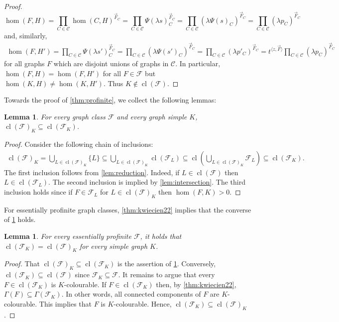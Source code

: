 \documentclass[3p,final]{elsarticle}
\DeclareMathOperator{\cl}{cl}
\newtheorem{lemma}[theorem]{Lemma}
\begin{document}
\begin{proof}
		\[
		\hom(F, H) 
		= \prod_{C \in \mathcal{C}} \hom(C, H)^{\vec{F}_C}
		= \prod_{C \in \mathcal{C}} \Psi(\lambda s)_C^{\vec{F}_C}
		= \prod_{C \in \mathcal{C}} \left(\lambda \Psi(s)_C\right)^{\vec{F}_C}
		= \prod_{C \in \mathcal{C}} \left(\lambda p_C \right)^{\vec{F}_C}
		\]
		and, similarly,
		\begin{align*}
			\hom(F, H') 
			= \prod_{C \in \mathcal{C}} \Psi(\lambda s')_C^{\vec{F}_C}
			= \prod_{C \in \mathcal{C}} \left(\lambda \Psi(s')_C\right)^{\vec{F}_C}
			= \prod_{C \in \mathcal{C}} \left(\lambda p'_C \right)^{\vec{F}_C}
			= t^{\langle z, \vec{F} \rangle} \prod_{C \in \mathcal{C}} \left(\lambda p_C \right)^{\vec{F}_C}
		\end{align*}
		for all graphs $F$ which are disjoint unions of graphs in $\mathcal{C}$. In particular, $\hom(F, H) = \hom(F, H')$ for all $F \in \mathcal{F}$ but $\hom(K, H) \neq \hom(K, H')$.
		Thus $K \not\in \cl(\mathcal{F})$.
	\end{proof}

	Towards the proof of \cref{thm:profinite}, we collect the following lemmas:

	
	\begin{lemma}\label{lem:cl-col}
		For every graph class $\mathcal{F}$ and every graph simple $K$, 
		$\cl(\mathcal{F})_K \subseteq \cl(\mathcal{F}_K)$.
	\end{lemma}
	\begin{proof}
		Consider the following chain of inclusions:
		\begin{align*}
			\cl(\mathcal{F})_K 
			= \bigcup_{L \in \cl(\mathcal{F})_K} \{L\}
			\subseteq \bigcup_{L \in \cl(\mathcal{F})_K} \cl(\mathcal{F}_L)
			\subseteq \cl\left( \bigcup_{L \in \cl(\mathcal{F})_K} \mathcal{F}_L \right)
			\subseteq \cl(\mathcal{F}_K).
		\end{align*}
		The first inclusion follows from \cref{lem:reduction}. Indeed, if $L \in \cl(\mathcal{F})$ then $L \in \cl(\mathcal{F}_L)$.
		The second inclusion is implied by \cref{lem:intersection}.
		The third inclusion holds since if $F \in \mathcal{F}_L$ for $L \in \cl(\mathcal{F})_K$ then $\hom(F, K) > 0$.
	\end{proof}
	For essentially profinite graph classes, \cref{thm:kwiecien22} implies that the converse of \cref{lem:cl-col} holds.
	
	\begin{lemma} \label{lem:pf-col}
		For every essentially profinite $\mathcal{F}$, it holds that $\cl(\mathcal{F}_K) = \cl(\mathcal{F})_K$ for every simple graph $K$.
	\end{lemma}
	\begin{proof}
		That $\cl(\mathcal{F})_K \subseteq \cl(\mathcal{F}_K)$ is the assertion of \cref{lem:cl-col}.	
		Conversely, $\cl(\mathcal{F}_K) \subseteq \cl(\mathcal{F})$ since $\mathcal{F}_K \subseteq \mathcal{F}$. It remains to argue that every $F \in \cl(\mathcal{F}_K)$ is $K$-colourable.
		If $F \in \cl(\mathcal{F}_K)$  then, by \cref{thm:kwiecien22}, $\Gamma(F) \subseteq \Gamma(\mathcal{F}_K)$. In other words, all connected components of $F$ are $K$-colourable. This implies that $F$ is $K$-colourable. Hence, $\cl(\mathcal{F}_K) \subseteq \cl(\mathcal{F})_K$.
	\end{proof}
	
\end{document}
